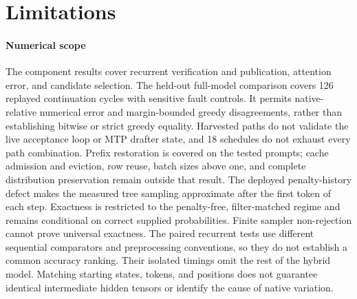 \documentclass[conference]{IEEEtran}
\begin{document}
\section{Limitations}
\label{sec:limitations}
\paragraph{Numerical scope}
The component results cover recurrent verification and publication, attention error, and candidate selection. The held-out full-model comparison covers 126 replayed continuation cycles with sensitive fault controls. It permits native-relative numerical error and margin-bounded greedy disagreements, rather than establishing bitwise or strict greedy equality. Harvested paths do not validate the live acceptance loop or MTP drafter state, and 18 schedules do not exhaust every path combination. Prefix restoration is covered on the tested prompts; cache admission and eviction, row reuse, batch sizes above one, and complete distribution preservation remain outside that result. The deployed penalty-history defect makes the measured tree sampling approximate after the first token of each step. Exactness is restricted to the penalty-free, filter-matched regime and remains conditional on correct supplied probabilities. Finite sampler non-rejection cannot prove universal exactness. The paired recurrent tests use different sequential comparators and preprocessing conventions, so they do not establish a common accuracy ranking. Their isolated timings omit the rest of the hybrid model. Matching starting states, tokens, and positions does not guarantee identical intermediate hidden tensors or identify the cause of native variation.
\end{document}
